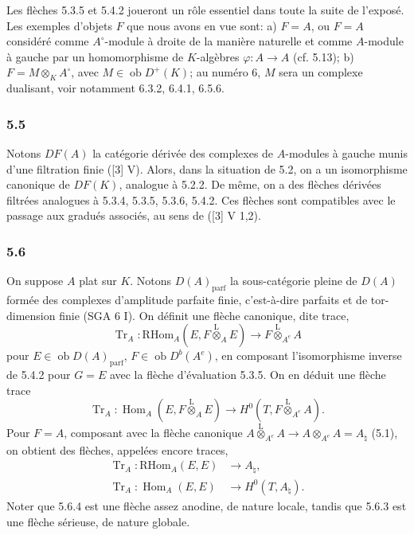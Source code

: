\documentclass[11pt]{article}
\DeclareMathOperator{\Hom}{Hom}
\newcommand{\ob}{\operatorname{ob}}
\providecommand{\RHom}{\mathrm{RHom}}
\providecommand{\Tr}{\operatorname{Tr}}
\providecommand{\Tr}{\operatorname{Tr}}
\providecommand{\lten}{\overset{\mathrm L}{\otimes}}
\providecommand{\Tr}{\operatorname{Tr}}
\providecommand{\RHom}{\mathrm{RHom}}
\providecommand{\Hom}{\operatorname{Hom}}
\providecommand{\ob}{\operatorname{ob}}
\providecommand{\lten}{\overset{\mathrm L}{\otimes}}
\providecommand{\RHom}{\mathrm R\mathcal{H}om}
\providecommand{\lten}{\overset{\mathrm L}{\otimes}}
\providecommand{\Tr}{\operatorname{Tr}}
\providecommand{\lten}{\overset{\mathrm L}{\otimes}}
\providecommand{\lten}{\overset{\mathrm L}{\otimes}}
\providecommand{\lten}{\overset{\mathrm L}{\otimes}}
\begin{document}
Les flèches 5.3.5 et 5.4.2 joueront un rôle essentiel dans toute la suite de l'exposé. Les exemples d'objets $F$ que nous avons en vue sont: a) $F=A$, ou $F=A$ considéré comme $A^\circ$-module à droite de la manière naturelle et comme $A$-module à gauche par un homomorphisme de $K$-algèbres $\varphi:A\to A$ (cf. 5.13); b) $F=M\otimes_KA^\circ$, avec $M\in\ob D^+(K)$; au numéro 6, $M$ sera un complexe dualisant, voir notamment 6.3.2, 6.4.1, 6.5.6.

\subsubsection*{5.5}

Notons $DF(A)$ la catégorie dérivée des complexes de $A$-modules à gauche munis d'une filtration finie ([3] V). Alors, dans la situation de 5.2, on a un isomorphisme canonique de $DF(K)$, analogue à 5.2.2. De même, on a des flèches dérivées filtrées analogues à 5.3.4, 5.3.5, 5.3.6, 5.4.2. Ces flèches sont compatibles avec le passage aux gradués associés, au sens de ([3] V 1,2).

\subsubsection*{5.6}

On suppose $A$ plat sur $K$. Notons $D(A)_{\mathrm{parf}}$ la sous-catégorie pleine de $D(A)$ formée des complexes d'amplitude parfaite finie, c'est-à-dire parfaits et de tor-dimension finie (SGA 6 I). On définit une flèche canonique, dite trace,
\begin{equation}\tag{5.6.1}
\Tr_A:\RHom_A(E,F\lten_AE)\longrightarrow F\lten_{A^e}A
\end{equation}
pour $E\in\ob D(A)_{\mathrm{parf}}$, $F\in\ob D^b(A^e)$, en composant l'isomorphisme inverse de 5.4.2 pour $G=E$ avec la flèche d'évaluation 5.3.5. On en déduit une flèche trace
\begin{equation}\tag{5.6.2}
\Tr_A:\Hom_A(E,F\lten_AE)\longrightarrow H^0(T,F\lten_{A^e}A).
\end{equation}
Pour $F=A$, composant avec la flèche canonique $A\lten_{A^e}A\to A\otimes_{A^e}A=A_\natural$ (5.1), on obtient des flèches, appelées encore traces,
\begin{align}
\Tr_A:\RHom_A(E,E)&\longrightarrow A_\natural,\tag{5.6.3}\\
\Tr_A:\Hom_A(E,E)&\longrightarrow H^0(T,A_\natural).\tag{5.6.4}
\end{align}
Noter que 5.6.4 est une flèche assez anodine, de nature locale, tandis que 5.6.3 est une flèche sérieuse, de nature globale.
\end{document}
